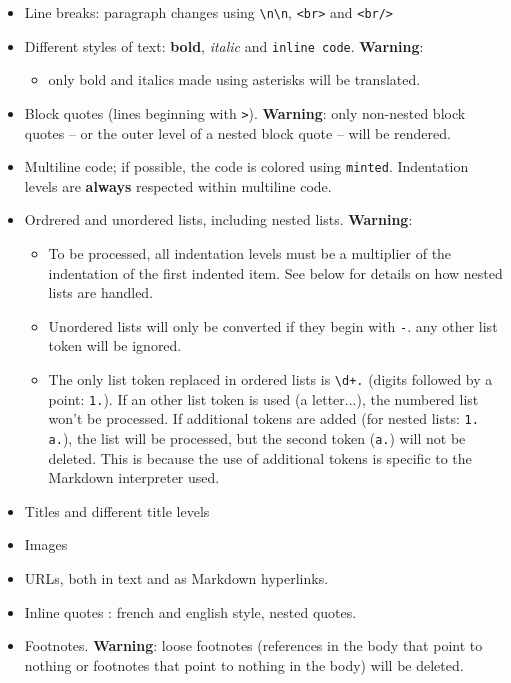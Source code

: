 \documentclass[a4paper, 12pt, twoside]{book}
\begin{document}
\begin{itemize}
\item Line breaks: paragraph changes using \texttt{\textbackslash{}n\textbackslash{}n}, \texttt{<br\textgreater{}} and \texttt{<br/\textgreater{}}
\item Different styles of text: \textbf{bold}, \textit{italic} and \texttt{inline code}. \textbf{Warning}:
\begin{itemize} 
 \item only bold and italics made using asterisks will be translated.
\end{itemize}
\item Block quotes (lines beginning with \texttt{\textgreater{}}). \textbf{Warning}: only non-nested block quotes -- or the outer level of a nested block quote -- will be rendered.
\item Multiline code; if possible, the code is colored using \texttt{minted}. Indentation levels are \textbf{always} respected within multiline code.
\item Ordrered and unordered lists, including nested lists. \textbf{Warning}:
\begin{itemize} 
 \item To be processed, all indentation levels must be a multiplier of the indentation of the first indented item. See below for details on how nested lists are handled.
\item Unordered lists will only be converted if they begin with \texttt{-}. any other list token will be ignored.
\item The only list token replaced in ordered lists is \texttt{\textbackslash{}d+.} (digits followed by a point: \texttt{1.}). If an other list token is used (a letter...), the numbered list won't be processed. If additional tokens are added (for nested lists: \texttt{1. a.}), the list will be processed, but the second token (\texttt{a.}) will not be deleted. This is because the use of additional tokens is specific to the Markdown interpreter used.
\end{itemize}
\item Titles and different title levels
\item Images
\item URLs, both in text and as Markdown hyperlinks.
\item Inline quotes : french and english style, nested quotes.
\item Footnotes. \textbf{Warning}: loose footnotes (references in the body that point to nothing or footnotes that point to nothing in the body) will be deleted. 
\end{itemize}
\end{document}
